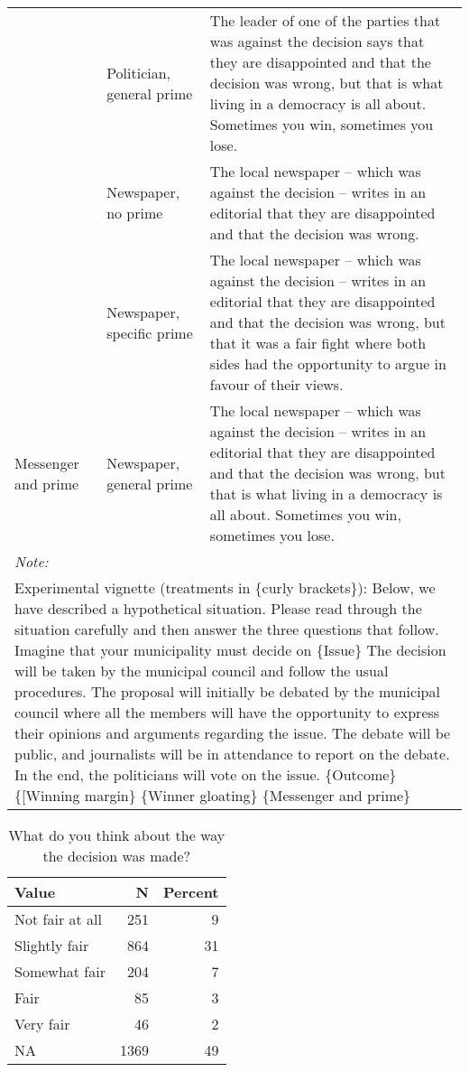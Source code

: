 \documentclass[
]{book}
\begin{document}
\begin{table}[H]
{\begin{tabular}[t]{lll}
 & Politician, general prime & The leader of one of the parties that was against the decision says that they are disappointed and that the decision was wrong,  but that is what living in a democracy is all about. Sometimes you win, sometimes you lose.\\

 & Newspaper, no prime & The local newspaper – which was against the decision – writes in an editorial that they are disappointed and that the decision was wrong.\\

 & Newspaper, specific prime & The local newspaper – which was against the decision – writes in an editorial that they are disappointed and that the decision was wrong, but that it was a fair fight where both sides had the opportunity to argue in favour of their views.\\

\multirow[t]{-7}{*}{\raggedright\arraybackslash Messenger and prime} & Newspaper, general prime & The local newspaper – which was against the decision – writes in an editorial that they are disappointed and that the decision was wrong, but that is what living in a democracy is all about. Sometimes you win, sometimes you lose.\\
\bottomrule
\multicolumn{3}{l}{\textit{Note: }}\\
\multicolumn{3}{l}{Experimental vignette (treatments in \{curly brackets\}): Below, we have described a hypothetical situation. Please read through the situation carefully and then answer the three questions that follow. Imagine that your municipality must decide on \{Issue\} The decision will be taken by the municipal council and follow the usual procedures. The proposal will initially be debated by the municipal council where all the members will have the opportunity to express their opinions and arguments regarding the issue. The debate will be public, and journalists will be in attendance to report on the debate. In the end, the politicians will vote on the issue. \{Outcome\} \{[Winning margin\} \{Winner gloating\} \{Messenger and prime\}}\\
\end{tabular}}
\end{table}

\begin{table}[H]

\caption{\label{tab:unnamed-chunk-4}What do you think about the way the decision was made?}
\centering
\begin{tabular}[t]{lrr}
\toprule
Value & N & Percent\\
\midrule
Not fair at all & 251 & 9\\
Slightly fair & 864 & 31\\
Somewhat fair & 204 & 7\\
Fair & 85 & 3\\
Very fair & 46 & 2\\
NA & 1369 & 49\\
\bottomrule
\end{tabular}
\end{table}
\end{document}
